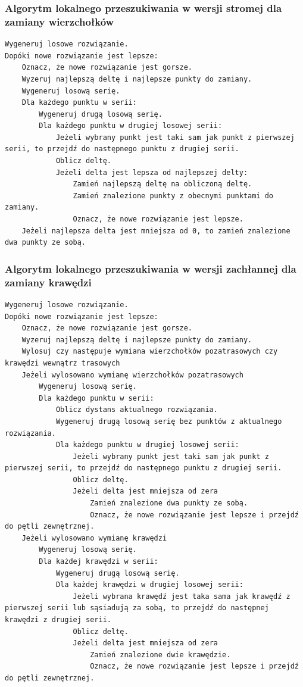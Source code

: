 \documentclass[a4paper]{article}
\begin{document}
\subsubsection{Algorytm lokalnego przeszukiwania w wersji stromej dla zamiany wierzchołków}

\begin{lstlisting}
Wygeneruj losowe rozwiązanie.
Dopóki nowe rozwiązanie jest lepsze:
    Oznacz, że nowe rozwiązanie jest gorsze.
    Wyzeruj najlepszą deltę i najlepsze punkty do zamiany.
    Wygeneruj losową serię.
    Dla każdego punktu w serii:
        Wygeneruj drugą losową serię.
        Dla każdego punktu w drugiej losowej serii:
			Jeżeli wybrany punkt jest taki sam jak punkt z pierwszej serii, to przejdź do następnego punktu z drugiej serii.
            Oblicz deltę.
            Jeżeli delta jest lepsza od najlepszej delty:
                Zamień najlepszą deltę na obliczoną deltę.
                Zamień znalezione punkty z obecnymi punktami do zamiany.
                Oznacz, że nowe rozwiązanie jest lepsze.
    Jeżeli najlepsza delta jest mniejsza od 0, to zamień znalezione dwa punkty ze sobą.
\end{lstlisting}

\subsubsection{Algorytm lokalnego przeszukiwania w wersji zachłannej dla zamiany krawędzi}

\begin{lstlisting}
Wygeneruj losowe rozwiązanie.
Dopóki nowe rozwiązanie jest lepsze:
    Oznacz, że nowe rozwiązanie jest gorsze.
    Wyzeruj najlepszą deltę i najlepsze punkty do zamiany.
    Wylosuj czy następuje wymiana wierzchołków pozatrasowych czy krawędzi wewnątrz trasowych
    Jeżeli wylosowano wymianę wierzchołków pozatrasowych
    	Wygeneruj losową serię.
    	Dla każdego punktu w serii:
        	Oblicz dystans aktualnego rozwiązania.
        	Wygeneruj drugą losową serię bez punktów z aktualnego rozwiązania.
        	Dla każdego punktu w drugiej losowej serii:
            	Jeżeli wybrany punkt jest taki sam jak punkt z pierwszej serii, to przejdź do następnego punktu z drugiej serii.
            	Oblicz deltę.
            	Jeżeli delta jest mniejsza od zera
                	Zamień znalezione dwa punkty ze sobą.
                	Oznacz, że nowe rozwiązanie jest lepsze i przejdź do pętli zewnętrznej.
	Jeżeli wylosowano wymianę krawędzi
    	Wygeneruj losową serię.
    	Dla każdej krawędzi w serii:
        	Wygeneruj drugą losową serię.
        	Dla każdej krawędzi w drugiej losowej serii:
            	Jeżeli wybrana krawędź jest taka sama jak krawędź z pierwszej serii lub sąsiadują za sobą, to przejdź do następnej krawędzi z drugiej serii.
            	Oblicz deltę.
            	Jeżeli delta jest mniejsza od zera
                	Zamień znalezione dwie krawędzie.
                	Oznacz, że nowe rozwiązanie jest lepsze i przejdź do pętli zewnętrznej.
\end{lstlisting}
\end{document}

